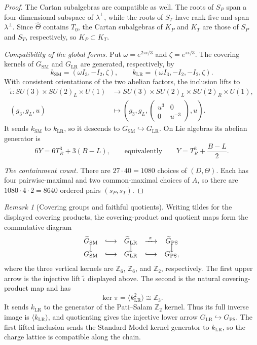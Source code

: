 \documentclass[11pt]{article}
\theoremstyle{remark}
\newtheorem*{remark}{Remark}
\newcommand{\Ksm}{G_{\mathrm{SM}}}
\newcommand{\Klr}{G_{\mathrm{LR}}}
\begin{document}
\begin{proof}
The Cartan subalgebras are compatible as well. The roots of \(S_P\) span a
four-dimensional subspace of \(\lambda^\perp\), while the roots of
\(S_T\) have rank five and span \(\lambda^\perp\). Since
\(\widehat\Theta\) contains \(T_0\), the Cartan subalgebras of
\(K_P\) and \(K_T\) are those of \(S_P\) and \(S_T\),
respectively, so \(K_P\subset K_T\).

\emph{Compatibility of the global forms.} Put
\(\omega=e^{2\pi i/3}\) and \(\zeta=e^{\pi i/3}\). The covering
kernels of \(\Ksm\) and \(\Klr\) are generated, respectively, by
\[
 k_{\mathrm{SM}}=(\omega I_3,-I_2,\zeta),
 \qquad
 k_{\mathrm{LR}}=(\omega I_3,-I_2,-I_2,\zeta).
\]
With consistent orientations of the two abelian factors, the inclusion lifts
to
\[
\begin{aligned}
 \widetilde\iota:
 SU(3)\times SU(2)_L\times U(1)
 &\longrightarrow
 SU(3)\times SU(2)_L\times SU(2)_R\times U(1),\\
 (g_3,g_L,u)&\longmapsto
 \left(g_3,g_L,
 \begin{pmatrix}u^3&0\\0&u^{-3}\end{pmatrix},u\right).
\end{aligned}
\]
It sends \(k_{\mathrm{SM}}\) to \(k_{\mathrm{LR}}\), so it descends to
\(\Ksm\hookrightarrow\Klr\). On Lie algebras its abelian generator is
\[
 6Y=6T_R^3+3(B-L),
 \qquad\text{equivalently}\qquad
 Y=T_R^3+\frac{B-L}{2}.
\]

\emph{The containment count.} There are \(27\cdot40=1080\) choices of \((D,\Theta)\). Each has four
pairwise-maximal and two common-maximal choices of \(A\), so there are
\(1080\cdot4\cdot2=8640\) ordered pairs \((s_P,s_T)\).
\end{proof}

\begin{remark}[Covering groups and faithful quotients]
Writing tildes for the displayed covering products, the covering-product and
quotient maps form the commutative diagram
\[
\begin{array}{ccccc}
 \widetilde G_{\mathrm{SM}}
 &\lhook\joinrel\longrightarrow&
 \widetilde G_{\mathrm{LR}}
 &\xrightarrow{\ \pi\ }&
 \widetilde G_{\mathrm{PS}}\\[-1mm]
 \big\downarrow && \big\downarrow && \big\downarrow\\[-1mm]
 G_{\mathrm{SM}}
 &\lhook\joinrel\longrightarrow&
 G_{\mathrm{LR}}
 &\lhook\joinrel\longrightarrow&
 G_{\mathrm{PS}},
\end{array}
\]
where the three vertical kernels are \(\mathbb Z_6\), \(\mathbb Z_6\), and
\(\mathbb Z_2\), respectively.  The first upper arrow is the injective lift
\(\widetilde\iota\) displayed above.  The second is the natural
covering-product map and has
\[
 \ker\pi=\langle k_{\mathrm{LR}}^2\rangle\cong\mathbb Z_3.
\]
It sends \(k_{\mathrm{LR}}\) to the generator of the Pati--Salam
\(\mathbb Z_2\) kernel.  Thus its full inverse image is
\(\langle k_{\mathrm{LR}}\rangle\), and quotienting gives the injective lower
arrow \(G_{\mathrm{LR}}\hookrightarrow G_{\mathrm{PS}}\).  The first lifted
inclusion sends the Standard Model kernel generator to
\(k_{\mathrm{LR}}\), so the charge lattice is compatible along the chain.
\end{remark}
\end{document}
